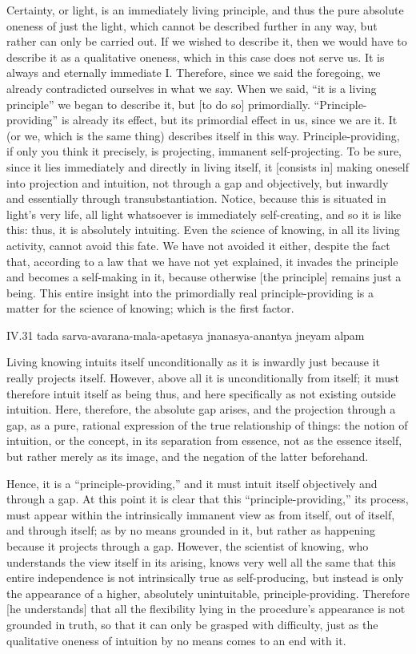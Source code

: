 Certainty, or light, is an immediately living principle,
and thus the pure absolute oneness of just the light,
which cannot be described further in any way,
but rather can only be carried out.
If we wished to describe it, then we would have to
describe it as a qualitative oneness,
which in this case does not serve us.
It is always and eternally immediate I.
Therefore, since we said the foregoing,
we already contradicted ourselves in what we say.
When we said, “it is a living principle”
we began to describe it, but [to do so] primordially.
“Principle-providing” is already its effect,
but its primordial effect in us, since we are it.
It (or we, which is the same thing) describes itself in this way.
Principle-providing, if only you think it precisely, is
projecting, immanent self-projecting.
To be sure, since it lies immediately and directly in living itself,
it [consists in] making oneself into projection and intuition,
not through a gap and objectively,
but inwardly and essentially through transubstantiation.
Notice, because this is situated in light's very life,
all light whatsoever is immediately self-creating,
and so it is like this:
thus, it is absolutely intuiting.
Even the science of knowing, in all its living activity,
cannot avoid this fate.
We have not avoided it either, despite the fact that,
according to a law that we have not yet explained,
it invades the principle and becomes a self-making in it,
because otherwise [the principle] remains just a being.
This entire insight into
the primordially real principle-providing is
a matter for the science of knowing;
which is the first factor.

IV.31
tada sarva-avarana-mala-apetasya jnanasya-anantya jneyam alpam

Living knowing intuits itself
unconditionally as it is inwardly
just because it really projects itself.
However, above all it is unconditionally from itself;
it must therefore intuit itself as being thus,
and here specifically as not existing outside intuition.
Here, therefore, the absolute gap arises,
and the projection through a gap,
as a pure, rational expression
of the true relationship of things:
the notion of intuition,
or the concept,
in its separation from essence,
not as the essence itself,
but rather merely as its image,
and the negation of the latter beforehand.

Hence, it is a “principle-providing,”
and it must intuit itself objectively and through a gap.
At this point it is clear that this “principle-providing,”
its process, must appear within the intrinsically immanent view as
from itself, out of itself, and through itself;
as by no means grounded in it, but rather as happening
because it projects through a gap.
However, the scientist of knowing,
who understands the view itself in its arising,
knows very well all the same that this entire independence is
not intrinsically true as self-producing,
but instead is only the appearance of a higher,
absolutely unintuitable, principle-providing.
Therefore [he understands] that all the flexibility
lying in the procedure's appearance is not grounded in truth,
so that it can only be grasped with difficulty,
just as the qualitative oneness of intuition
by no means comes to an end with it.


